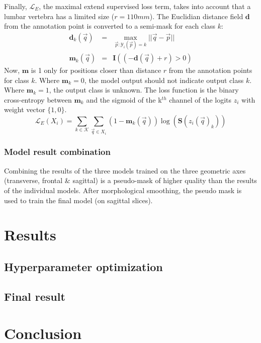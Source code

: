 \begin{multicols}{2}
\begin{equation}
\end{equation}
\par{
    Finally, $\mathcal{L}_E$, the maximal extend supervised loss term, takes into account that a lumbar vertebra has a limited size ($r=110mm$).
    The Euclidian distance field $\mathbf{d}$ from the annotation point is converted to a semi-mask for each class $k$:
    \begin{eqnarray}
        \mathbf{d}_k(\vec{q}) &=& \max_{\vec{p}:\mathcal{Y}_i(\vec{p})=k}||\vec{q} - \vec{p}||\\
        \mathbf{m}_k(\vec{q}) &=& \mathbf{I}\left( (-\mathbf{d}(\vec{q}) + r) > 0 \right)
    \end{eqnarray}
    Now, $\mathbf{m}$ is 1 only for positions closer than distance $r$ from the annotation points for class $k$.
    Where $\mathbf{m}_k=0$, the model output should not indicate output class $k$. Where $\mathbf{m}_k=1$, the output class is unknown.
    The loss function is the binary cross-entropy between $\mathbf{m}_k$ and the sigmoid of the k$^{th}$ channel of the logits $z_i$ with weight vector $\{1, 0\}$.
}
\begin{equation}
    \mathcal{L}_E(X_i) = \sum_{k\in\mathcal{K}}\sum_{\vec{q}\in X_i}  (1-\mathbf{m}_k(\vec{q})) \log(\mathbf{S}(z_i(\vec{q})_k)) 
\end{equation}

\subsubsection*{Model result combination}
\par{
    Combining the results of the three models trained on the three geometric axes (transverse, frontal \& sagittal) is a pseudo-mask of higher quality than the results of the individual models.
    After morphological smoothing, the pseudo mask is used to train the final model (on sagittal slices).
}
\thispagestyle{plain}
\section*{Results}
\subsection*{Hyperparameter optimization}


\subsection*{Final result}

\section*{Conclusion}
\cleardoublepage
\end{multicols}